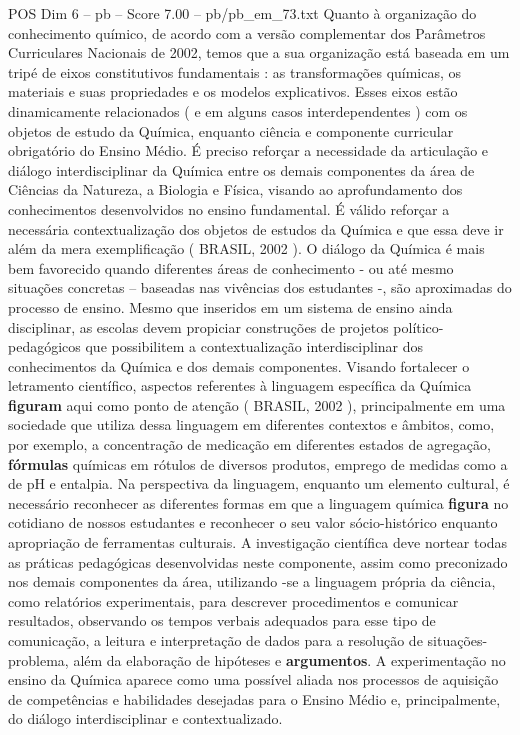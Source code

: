 \begin{textsample}{POS Dim 6 – pb – Score 7.00 – pb/pb\_em\_73.txt}
Quanto à organização do conhecimento químico, de acordo com a versão complementar dos Parâmetros Curriculares Nacionais de 2002, temos que a sua organização está baseada em um tripé de eixos constitutivos fundamentais : as transformações químicas, os materiais e suas propriedades e os modelos explicativos.
Esses eixos estão dinamicamente relacionados ( e em alguns casos interdependentes ) com os objetos de estudo da Química, enquanto ciência e componente curricular obrigatório do Ensino Médio.
É preciso reforçar a necessidade da articulação e diálogo interdisciplinar da Química entre os demais componentes da área de Ciências da Natureza, a Biologia e Física, visando ao aprofundamento dos conhecimentos desenvolvidos no ensino fundamental.
É válido reforçar a necessária contextualização dos objetos de estudos da Química e que essa deve ir além da mera exemplificação ( BRASIL, 2002 ).
O diálogo da Química é mais bem favorecido quando diferentes áreas de conhecimento - ou até mesmo situações concretas – baseadas nas vivências dos estudantes -, são aproximadas do processo de ensino.
Mesmo que inseridos em um sistema de ensino ainda disciplinar, as escolas devem propiciar construções de projetos político-pedagógicos que possibilitem a contextualização interdisciplinar dos conhecimentos da Química e dos demais componentes.
Visando fortalecer o letramento científico, aspectos referentes à linguagem específica da Química \textbf{figuram} aqui como ponto de atenção ( BRASIL, 2002 ), principalmente em uma sociedade que utiliza dessa linguagem em diferentes contextos e âmbitos, como, por exemplo, a concentração de medicação em diferentes estados de agregação, \textbf{fórmulas} químicas em rótulos de diversos produtos, emprego de medidas como a de pH e entalpia.
Na perspectiva da linguagem, enquanto um elemento cultural, é necessário reconhecer as diferentes formas em que a linguagem química \textbf{figura} no cotidiano de nossos estudantes e reconhecer o seu valor sócio-histórico enquanto apropriação de ferramentas culturais.
A investigação científica deve nortear todas as práticas pedagógicas desenvolvidas neste componente, assim como preconizado nos demais componentes da área, utilizando -se a linguagem própria da ciência, como relatórios experimentais, para descrever procedimentos e comunicar resultados, observando os tempos verbais adequados para esse tipo de comunicação, a leitura e interpretação de dados para a resolução de situações-problema, além da elaboração de hipóteses e \textbf{argumentos}.
A experimentação no ensino da Química aparece como uma possível aliada nos processos de aquisição de competências e habilidades desejadas para o Ensino Médio e, principalmente, do diálogo interdisciplinar e contextualizado.

\end{textsample}
